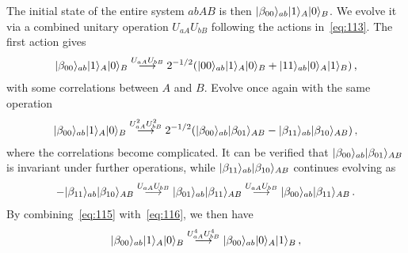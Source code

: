 \documentclass[12pt,a4paper]{article}
\begin{document}
The initial state of the entire system $abAB$ is then
$\arrowvert\beta_{00}\rangle_{ab}\arrowvert 1\rangle_A\arrowvert
0\rangle_B$. We evolve it via a combined unitary
operation $U_{aA}U_{bB}$ following the actions in~\eqref{eq:113}.
The first action gives
\begin{equation}
\label{eq:114}
\begin{split}
\arrowvert\beta_{00}\rangle_{ab}\arrowvert 1\rangle_A\arrowvert
0\rangle_B
\stackrel{U_{aA}U_{bB}}{\longrightarrow}2^{-1/2}(\arrowvert
00\rangle_{ab}\arrowvert 1\rangle_A\arrowvert 0\rangle_B+\arrowvert
11\rangle_{ab}\arrowvert 0\rangle_A\arrowvert 1\rangle_B) \,,
\end{split}
\end{equation}
with some correlations between $A$ and $B$. Evolve once again with the same operation
\begin{equation}
\label{eq:115}
\begin{split}
\arrowvert\beta_{00}\rangle_{ab}\arrowvert 1\rangle_A\arrowvert
0\rangle_B
\stackrel{U_{aA}^2U_{bB}^2}{\longrightarrow}2^{-1/2}(\arrowvert
\beta_{00}\rangle_{ab}\arrowvert \beta_{01}\rangle_{AB}-\arrowvert
\beta_{11}\rangle_{ab}\arrowvert \beta_{10}\rangle_{AB}) \,,
\end{split}
\end{equation}
where the correlations become complicated. It can be verified
that $\arrowvert \beta_{00}\rangle_{ab}\arrowvert
\beta_{01}\rangle_{AB}$ is invariant under further operations, while $\arrowvert \beta_{11}\rangle_{ab}\arrowvert \beta_{10}\rangle_{AB}$ continues evolving as
\begin{equation}
\label{eq:116}
\begin{split}
-\arrowvert \beta_{11}\rangle_{ab}\arrowvert \beta_{10}\rangle_{AB}
\stackrel{U_{aA}U_{bB}}{\longrightarrow}\arrowvert
\beta_{01}\rangle_{ab}\arrowvert
\beta_{11}\rangle_{AB}\stackrel{U_{aA}U_{bB}}{\longrightarrow}\arrowvert
\beta_{00}\rangle_{ab}\arrowvert \beta_{11}\rangle_{AB} \,.
\end{split}
\end{equation}
By combining~\eqref{eq:115} with~\eqref{eq:116}, we then have
\begin{equation}
\label{eq:117}
\begin{split}
\arrowvert\beta_{00}\rangle_{ab}\arrowvert 1\rangle_A\arrowvert
0\rangle_B
\stackrel{U_{aA}^4U_{bB}^4}{\longrightarrow}\arrowvert\beta_{00}\rangle_{ab}\arrowvert
0\rangle_A\arrowvert 1\rangle_B \,,
\end{split}
\end{equation}
\end{document}
